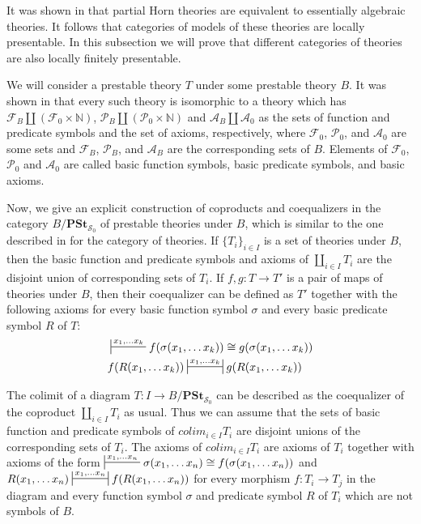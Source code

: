 \documentclass[reqno]{amsart}
\theoremstyle{definition}
\theoremstyle{remark}
\newcommand{\cat}[1]{\mathbf{#1}}
\newcommand{\PSt}{\cat{PSt}}
\numberwithin{figure}{section}
\begin{document}
It was shown in \cite{PHL} that partial Horn theories are equivalent to essentially algebraic theories.
It follows that categories of models of these theories are locally presentable.
In this subsection we will prove that different categories of theories are also locally finitely presentable.

We will consider a prestable theory $T$ under some prestable theory $B$.
It was shown in \cite[Lemma~4.4]{alg-tt} that every such theory is isomorphic to a theory which has $\mathcal{F}_B \amalg (\mathcal{F}_0 \times \mathbb{N})$,
$\mathcal{P}_B \amalg (\mathcal{P}_0 \times \mathbb{N})$ and $\mathcal{A}_B \amalg \mathcal{A}_0$ as the sets of function and predicate symbols and the set of axioms, respectively,
where $\mathcal{F}_0$, $\mathcal{P}_0$, and $\mathcal{A}_0$ are some sets and $\mathcal{F}_B$, $\mathcal{P}_B$, and $\mathcal{A}_B$ are the corresponding sets of $B$.
Elements of $\mathcal{F}_0$, $\mathcal{P}_0$ and $\mathcal{A}_0$ are called basic function symbols, basic predicate symbols, and basic axioms.

Now, we give an explicit construction of coproducts and coequalizers in the category $B/\PSt_{\mathcal{S}_0}$ of prestable theories under $B$,
which is similar to the one described in \cite[Proposition~2.12]{alg-tt} for the category of theories.
If $\{ T_i \}_{i \in I}$ is a set of theories under $B$, then the basic function and predicate symbols
and axioms of $\coprod_{i \in I} T_i$ are the disjoint union of corresponding sets of $T_i$.
If $f,g : T \to T'$ is a pair of maps of theories under $B$, then their coequalizer can be defined as
$T'$ together with the following axioms for every basic function symbol $\sigma$ and every basic predicate symbol $R$ of $T$:
\begin{align*}
& \sststile{}{x_1, \ldots x_k} f(\sigma(x_1, \ldots x_k)) \cong g(\sigma(x_1, \ldots x_k)) \\
& f(R(x_1, \ldots x_k)) \ssststile{}{x_1, \ldots x_k} g(R(x_1, \ldots x_k))
\end{align*}

The colimit of a diagram $T : I \to B/\PSt_{\mathcal{S}_0}$ can be described as the coequalizer of the coproduct $\coprod_{i \in I} T_i$ as usual.
Thus we can assume that the sets of basic function and predicate symbols of $colim_{i \in I} T_i$ are disjoint unions of the corresponding sets of $T_i$.
The axioms of $colim_{i \in I} T_i$ are axioms of $T_i$ together with axioms of the form $\sststile{}{x_1, \ldots x_n} \sigma(x_1, \ldots x_n) \cong f(\sigma(x_1, \ldots x_n))$
and $R(x_1, \ldots x_n) \ssststile{}{x_1, \ldots x_n} f(R(x_1, \ldots x_n))$ for every morphism $f : T_i \to T_j$
in the diagram and every function symbol $\sigma$ and predicate symbol $R$ of $T_i$ which are not symbols of $B$.
\end{document}
